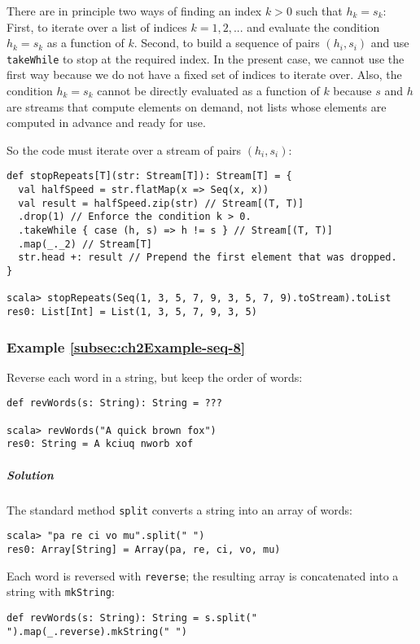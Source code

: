 There are in principle two ways of finding an index $k>0$ such that
$h_{k}=s_{k}$: First, to iterate over a list of indices $k=1,2,...$
and evaluate the condition $h_{k}=s_{k}$ as a function of $k$. Second,
to build a sequence of pairs $\left(h_{i},s_{i}\right)$ and use \lstinline!takeWhile!
to stop at the required index. In the present case, we cannot use
the first way because we do not have a fixed set of indices to iterate
over. Also, the condition $h_{k}=s_{k}$ cannot be directly evaluated
as a function of $k$ because $s$ and $h$ are streams that compute
elements on demand, not lists whose elements are computed in advance
and ready for use. 

So the code must iterate over a stream of pairs $\left(h_{i},s_{i}\right)$:
\begin{lstlisting}
def stopRepeats[T](str: Stream[T]): Stream[T] = {
  val halfSpeed = str.flatMap(x => Seq(x, x))
  val result = halfSpeed.zip(str) // Stream[(T, T)]
  .drop(1) // Enforce the condition k > 0.
  .takeWhile { case (h, s) => h != s } // Stream[(T, T)]
  .map(_._2) // Stream[T]
  str.head +: result // Prepend the first element that was dropped.
}

scala> stopRepeats(Seq(1, 3, 5, 7, 9, 3, 5, 7, 9).toStream).toList
res0: List[Int] = List(1, 3, 5, 7, 9, 3, 5)
\end{lstlisting}


\subsubsection{Example \label{subsec:ch2Example-seq-8}\ref{subsec:ch2Example-seq-8}}

Reverse each word in a string, but keep the order of words:
\begin{lstlisting}
def revWords(s: String): String = ???

scala> revWords("A quick brown fox")
res0: String = A kciuq nworb xof
\end{lstlisting}


\subparagraph{Solution}

The standard method \lstinline!split! converts a string into an array
of words:
\begin{lstlisting}
scala> "pa re ci vo mu".split(" ")
res0: Array[String] = Array(pa, re, ci, vo, mu)
\end{lstlisting}
Each word is reversed with \lstinline!reverse!; the resulting array
is concatenated into a string with \lstinline!mkString!:
\begin{lstlisting}
def revWords(s: String): String = s.split(" ").map(_.reverse).mkString(" ")
\end{lstlisting}



